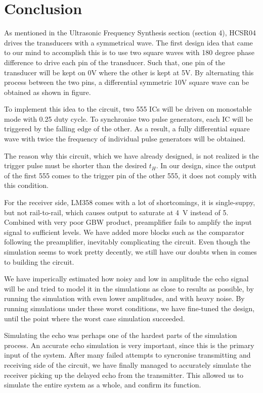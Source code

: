\documentclass[12pt, a4paper]{article}
\begin{document}
      
    \pagebreak
    \section{Conclusion}
    
        As mentioned in the Ultrasonic Frequency Synthesis section (section 4), HCSR04 drives the transducers with a symmetrical wave. The first design idea that came to our mind to accomplish this is to use  two square waves with 180 degree phase difference to drive each pin of the transducer. Such that, one pin of the transducer will be kept on 0V where the other is kept at 5V. By alternating this process between the two pins, a differential symmetric 10V square wave can be obtained as shown in figure.
        
        To implement this idea to the circuit, two 555 ICs will be driven on monostable mode with 0.25 duty cycle. To synchronise two pulse generators, each IC will be triggered by the falling edge of the other. As a result, a fully differential square wave with twice the frequency of individual pulse generators will be obtained.
        
        The reason why this circuit, which we have already designed, is not realized is the trigger pulse must be shorter than the desired
        $t_H$. In our design, since the output of the first 555 comes to the trigger pin of the other 555, it does not comply with this condition.
    
        \bigskip
        For the receiver side, LM358 comes with a lot of shortcomings, it is single-suppy, but not rail-to-rail, which causes output to saturate at \SI{4}{\volt} instead of 5. Combined with very poor GBW product, preamplifier fails to amplify the input signal to sufficient levels. We have added more blocks such as the comparator following the preamplifier, inevitably complicating the circuit. Even though the simulation seems to work pretty decently, we still have our doubts when in comes to building the circuit. 

        \bigskip
        We have imperically estimated how noisy and low in amplitude the echo signal will be and tried to model it in the simulations as close to results as possible, by running the simulation with even lower amplitudes, and with heavy noise. By running simulations under these worst conditions, we have fine-tuned the design, until the point where the worst case simulation succeeded.

        \bigskip
        Simulating the echo was perhaps one of the hardest parts of the simulation process. An accurate echo simulation is very important, since this is the primary input of the system. After many failed attempts to syncronise transmitting and receiving side of the circuit, we have finally managed to accurately simulate the receiver picking up the delayed echo from the transmitter. This allowed us to simulate the entire system as a whole, and confirm its function.
        
\end{document}
